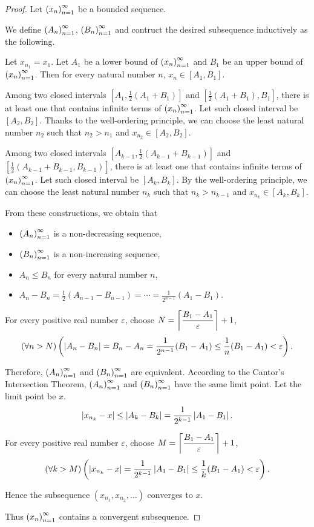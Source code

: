 \begin{proof}
    Let ${\left({x_{n}}\right)}^{\infty}_{n=1}$ be a bounded sequence.

    We define ${\left({A_{n}}\right)}^{\infty}_{n=1}$, ${\left({B_{n}}\right)}^{\infty}_{n=1}$ and contruct the desired subsequence inductively as the following.

    Let $x_{n_{1}} = x_{1}$. Let $A_{1}$ be a lower bound of ${\left({x_{n}}\right)}^{\infty}_{n=1}$ and $B_{1}$ be an upper bound of ${\left({x_{n}}\right)}^{\infty}_{n=1}$. Then for every natural number $n$, $x_{n}\in [A_{1}, B_{1}]$.

    Among two closed intervals $\left[A_{1}, \frac{1}{2}(A_{1} + B_{1})\right]$ and $\left[\frac{1}{2}(A_{1} + B_{1}), B_{1}\right]$, there is at least one that contains infinite terms of ${\left({x_{n}}\right)}^{\infty}_{n=1}$. Let such closed interval be $[A_{2}, B_{2}]$. Thanks to the well-ordering principle, we can choose the least natural number $n_{2}$ such that $n_{2} > n_{1}$ and $x_{n_{2}}\in [A_{2}, B_{2}]$.

    Among two closed intervals $\left[A_{k-1}, \frac{1}{2}(A_{k-1} + B_{k-1})\right]$ and $\left[\frac{1}{2}(A_{k-1} + B_{k-1}, B_{k-1})\right]$, there is at least one that contains infinite terms of ${\left({x_{n}}\right)}^{\infty}_{n=1}$. Let such closed interval be $[A_{k}, B_{k}]$. By the well-ordering principle, we can choose the least natural number $n_{k}$ such that $n_{k} > n_{k-1}$ and $x_{n_{k}}\in [A_{k}, B_{k}]$.

    From these constructions, we obtain that
    \begin{itemize}
        \item ${\left({A_{n}}\right)}^{\infty}_{n=1}$ is a non-decreasing sequence,
        \item ${\left({B_{n}}\right)}^{\infty}_{n=1}$ is a non-increasing sequence,
        \item $A_{n}\le B_{n}$ for every natural number $n$,
        \item $A_{n} - B_{n} = \frac{1}{2}(A_{n-1} - B_{n-1}) = \cdots = \frac{1}{2^{n-1}}(A_{1} - B_{1})$.
    \end{itemize}

    For every positive real number $\varepsilon$, choose $N = \left\lceil{\dfrac{B_{1} - A_{1}}{\varepsilon}}\right\rceil + 1$,
    \[
        (\forall n > N)\left(\left\vert{A_{n} - B_{n}}\right\vert = B_{n} - A_{n} = \frac{1}{2^{n-1}}(B_{1} - A_{1})\le \frac{1}{n}(B_{1} - A_{1}) < \varepsilon\right).
    \]

    Therefore, ${\left({A_{n}}\right)}^{\infty}_{n=1}$ and ${\left({B_{n}}\right)}^{\infty}_{n=1}$ are equivalent. According to the Cantor's Intersection Theorem, ${\left({A_{n}}\right)}^{\infty}_{n=1}$ and ${\left({B_{n}}\right)}^{\infty}_{n=1}$ have the same limit point. Let the limit point be $x$.
    \[
        \left\vert{x_{n_{k}} - x}\right\vert \le \left\vert{A_{k} - B_{k}}\right\vert = \frac{1}{2^{k-1}} \left\vert{A_{1} - B_{1}}\right\vert.
    \]

    For every positive real number $\varepsilon$, choose $M = \left\lceil{\dfrac{B_{1} - A_{1}}{\varepsilon}}\right\rceil + 1$,
    \[
        (\forall k > M)\left(\left\vert{x_{n_{k}} - x}\right\vert = \frac{1}{2^{k-1}}\left\vert{A_{1} - B_{1}}\right\vert \le \frac{1}{k}(B_{1} - A_{1}) < \varepsilon\right).
    \]

    Hence the subsequence $(x_{n_{1}}, x_{n_{2}}, \ldots)$ converges to $x$.

    Thus ${\left({x_{n}}\right)}^{\infty}_{n=1}$ contains a convergent subsequence.
\end{proof}

